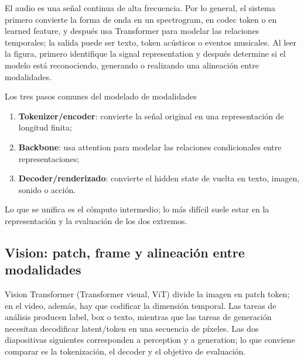El audio es una señal continua de alta frecuencia. Por lo general, el sistema primero convierte la forma de onda en un spectrogram, en codec token o en learned feature, y después usa Transformer para modelar las relaciones temporales; la salida puede ser texto, token acústicos o eventos musicales. Al leer la figura, primero identifique la signal representation y después determine si el modelo está reconociendo, generando o realizando una alineación entre modalidades.



\begin{importantbox}{Los tres pasos comunes del modelado de modalidades}
\begin{enumerate}
  \item \textbf{Tokenizer/encoder}: convierte la señal original en una representación de longitud finita;
  \item \textbf{Backbone}: usa attention para modelar las relaciones condicionales entre representaciones;
  \item \textbf{Decoder/renderizado}: convierte el hidden state de vuelta en texto, imagen, sonido o acción.
\end{enumerate}
Lo que se unifica es el cómputo intermedio; lo más difícil suele estar en la representación y la evaluación de los dos extremos.
\end{importantbox}

\subsection{Vision: patch, frame y alineación entre modalidades}

Vision Transformer (Transformer visual, ViT) divide la imagen en patch token; en el video, además, hay que codificar la dimensión temporal. Las tareas de análisis producen label, box o texto, mientras que las tareas de generación necesitan decodificar latent/token en una secuencia de píxeles. Las dos diapositivas siguientes corresponden a perception y a generation; lo que conviene comparar es la tokenización, el decoder y el objetivo de evaluación.

